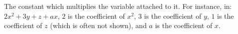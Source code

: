 The constant which multiplies the variable attached to it. For instance, in: $2x^{2}+3y+z+ax$, $2$ is the coefficient of $x^{2}$, $3$ is the coefficient of $y$, $1$ is the coefficient of $z$ (which is often not shown), and $a$ is the coefficient of $x$.
